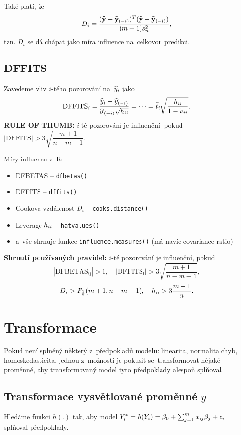 \begin{remark}
	Také platí, že
	 $$ D_i = \frac{(\widehat{\mathbf{y}}-\widehat{\mathbf{y}}_{(-i)})^T(\widehat{\mathbf{y}}-\widehat{\mathbf{y}}_{(-i)})}{(m+1)s_n^2},$$
	tzn. $D_i$ se dá chápat jako míra influence na~celkovou predikci.
\end{remark}

\subsection{DFFITS}
Zavedeme vliv $i$-tého pozorování na~$\widehat{y}_i$ jako
 $$ \mathrm{DFFITS}_i = \frac{\widehat{y}_i-\widehat{y}_{(-i)}}{\widehat{{\sigma}}_{(-i)}\sqrt{h_{ii}}} = \dots = \widehat{t}_i\sqrt{\frac{h_{ii}}{1-h_{ii}}}. $$
\textbf{RULE OF THUMB:} $i$-té pozorování je influenční, pokud $|\mathrm{DFFITS}|>3\sqrt{\dfrac{m+1}{n-m-1}}$.

\begin{remark}Míry influence v~R:
\begin{itemize}
	\item DFBETAS -- \verb|dfbetas()|
	\item DFFITS -- \verb|dffits()|
	\item Cookova vzdálenost $D_i$ -- \verb|cooks.distance()|
	\item Leverage $h_{ii}$ -- \verb|hatvalues()|
	\item a~vše shrnuje funkce \verb|influence.measures()| (má navíc covariance ratio)
\end{itemize}
\end{remark}

\textbf{Shrnutí používaných pravidel:} $i$-té pozorování je influenční, pokud
$$|\mathrm{DFBETAS_{ij}} | > 1, \quad |\mathrm{DFFITS_i}| > 3 \sqrt{\frac{m+1}{n-m-1}},$$
$$ D_i > F_{\frac{1}{2}}(m+1,n-m-1), \quad h_{ii} > 3 \frac{m+1}{n}.$$


\section{Transformace}

Pokud není splněný některý z~předpokladů modelu: linearita, normalita chyb, homoskedasticita, jednou z~možností je pokusit se~transformovat nějaké proměnné, aby transformovaný model tyto předpoklady alespoň  splňoval.

\subsection{Transformace vysvětlované proměnné $y$ }

Hledáme funkci $h(.)$ tak, aby model $Y_i^* = h(Y_i) = \beta_0 + \sum_{j=1}^{m} x_{ij} \beta_j + e_i$ splňoval předpoklady.

